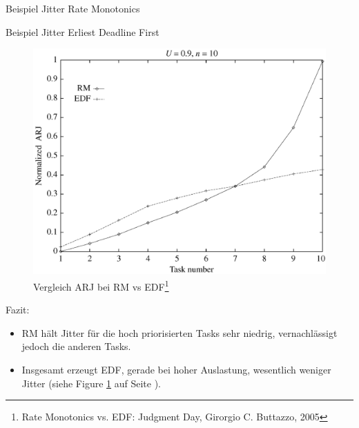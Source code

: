 \begin{frame}{Beispiel Jitter Rate Monotonics}
	
\end{frame}

\begin{frame}{Beispiel Jitter Erliest Deadline First}
	
\end{frame}

\begin{frame}{\subsecname}
	\begin{figure}[htbp]
		\begin{center}
			\includegraphics[scale=.30]{graphics/vergleich/jitter.png}
		\end{center}
		\caption{Vergleich ARJ bei RM vs EDF\footnote{Rate Monotonics vs. EDF: Judgment Day, Girorgio C. Buttazzo, 2005}}
		\label{fig:jitter}
	\end{figure}
	
\end{frame}

\begin{frame}{Fazit:}
	\begin{itemize}
		\item RM hält Jitter für die hoch priorisierten Tasks sehr niedrig, vernachlässigt jedoch die anderen Tasks.
		\item Insgesamt erzeugt EDF, gerade bei hoher Auslastung, wesentlich weniger Jitter (siehe Figure \ref{fig:jitter} auf Seite \pageref{fig:jitter}).
	\end{itemize}
\end{frame}

%